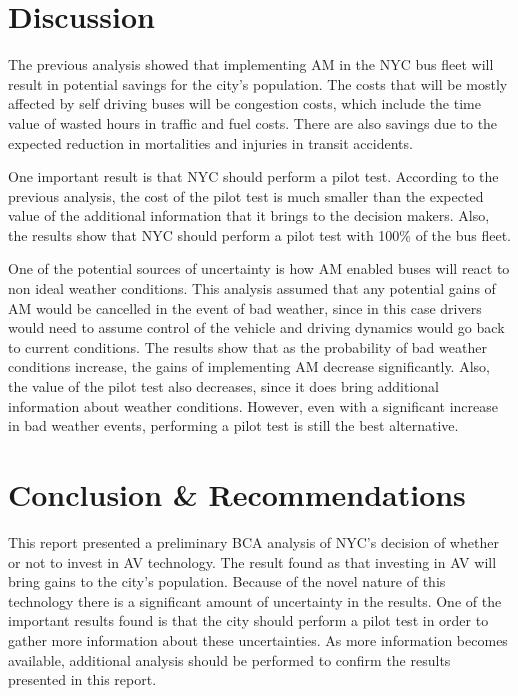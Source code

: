 \documentclass[11pt, letterpaper]{article}
\begin{document}
\section{Discussion} \label{discussion}

The previous analysis showed that implementing AM in the NYC bus fleet will result in potential savings
for the city's population. The costs that will be mostly affected by self driving buses will be congestion costs,
which include the time value of wasted hours in traffic and fuel costs. There are also savings due to the expected
reduction in mortalities and injuries in transit accidents. 

One important result is that NYC should perform a pilot test. According to the previous analysis, the cost of the pilot test is
much smaller than the expected value of the additional information that it brings to the decision makers. Also, the results show
that NYC should perform a pilot test with 100\% of the bus fleet.

One of the potential sources of uncertainty is how AM enabled buses will react to non ideal weather conditions. This analysis
assumed that any potential gains of AM would be cancelled in the event of bad weather, since in this case drivers would 
need to assume control of the vehicle and driving dynamics would go back to current conditions. The results show that 
as the probability of bad weather conditions increase, the gains of implementing AM decrease significantly. Also, the value
of the pilot test also decreases, since it does bring additional information about weather conditions. However, even with a 
significant increase in bad weather events, performing a pilot test is still the best alternative.

\section{Conclusion \& Recommendations} \label{conclusion}

This report presented a preliminary BCA analysis of NYC's decision of whether or not to invest in AV technology.
The result found as that investing in AV will bring gains to the city's population. Because of the novel nature of this technology
there is a significant amount of uncertainty in the results. One of the important results found is that the city should perform a pilot test
in order to gather more information about these uncertainties. As more information becomes available, additional analysis should be performed to confirm the results presented in this report.
\end{document}
